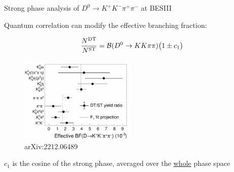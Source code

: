 \documentclass{beamer}
\begin{document}
\begin{frame}{Strong phase analysis of $D^0\to K^+K^-\pi^+\pi^-$ at BESIII}
  \begin{center}
    Quantum correlation can modify the effective branching fraction:
  \end{center}
  \begin{equation*}
    \frac{N^{\rm DT}}{N^{\rm ST}} = \mathcal{B}(D^0\to KK\pi\pi)\big(1\pm c_1\big)
  \end{equation*}
  \begin{figure}
    \includegraphics[width = 0.50\textwidth]{Plots/CPeven_fraction_combination_CPtags.png}
    \caption*{\tiny arXiv:2212.06489}
  \end{figure}
  \vspace{-0.3cm}
  \begin{center}
    $c_1$ is the cosine of the strong phase, averaged over the \underline{whole} phase space
  \end{center}
\end{frame}
\end{document}

